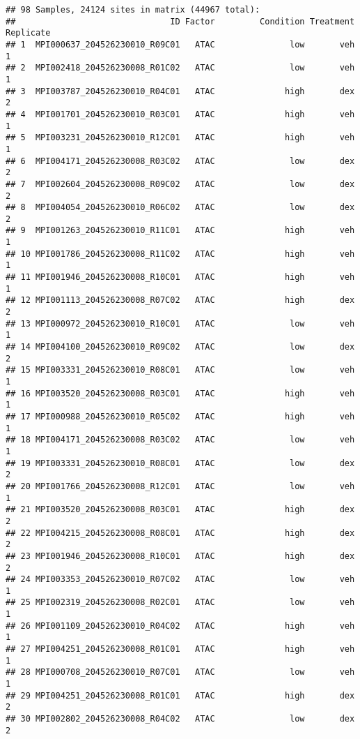 \documentclass[
]{article}
\begin{document}
\begin{verbatim}
## 98 Samples, 24124 sites in matrix (44967 total):
##                               ID Factor         Condition Treatment Replicate
## 1  MPI000637_204526230010_R09C01   ATAC               low       veh         1
## 2  MPI002418_204526230008_R01C02   ATAC               low       veh         1
## 3  MPI003787_204526230010_R04C01   ATAC              high       dex         2
## 4  MPI001701_204526230010_R03C01   ATAC              high       veh         1
## 5  MPI003231_204526230010_R12C01   ATAC              high       veh         1
## 6  MPI004171_204526230008_R03C02   ATAC               low       dex         2
## 7  MPI002604_204526230008_R09C02   ATAC               low       dex         2
## 8  MPI004054_204526230010_R06C02   ATAC               low       dex         2
## 9  MPI001263_204526230010_R11C01   ATAC              high       veh         1
## 10 MPI001786_204526230008_R11C02   ATAC              high       veh         1
## 11 MPI001946_204526230008_R10C01   ATAC              high       veh         1
## 12 MPI001113_204526230008_R07C02   ATAC              high       dex         2
## 13 MPI000972_204526230010_R10C01   ATAC               low       veh         1
## 14 MPI004100_204526230010_R09C02   ATAC               low       dex         2
## 15 MPI003331_204526230010_R08C01   ATAC               low       veh         1
## 16 MPI003520_204526230008_R03C01   ATAC              high       veh         1
## 17 MPI000988_204526230010_R05C02   ATAC              high       veh         1
## 18 MPI004171_204526230008_R03C02   ATAC               low       veh         1
## 19 MPI003331_204526230010_R08C01   ATAC               low       dex         2
## 20 MPI001766_204526230008_R12C01   ATAC               low       veh         1
## 21 MPI003520_204526230008_R03C01   ATAC              high       dex         2
## 22 MPI004215_204526230008_R08C01   ATAC              high       dex         2
## 23 MPI001946_204526230008_R10C01   ATAC              high       dex         2
## 24 MPI003353_204526230010_R07C02   ATAC               low       veh         1
## 25 MPI002319_204526230008_R02C01   ATAC               low       veh         1
## 26 MPI001109_204526230010_R04C02   ATAC              high       veh         1
## 27 MPI004251_204526230008_R01C01   ATAC              high       veh         1
## 28 MPI000708_204526230010_R07C01   ATAC               low       veh         1
## 29 MPI004251_204526230008_R01C01   ATAC              high       dex         2
## 30 MPI002802_204526230008_R04C02   ATAC               low       dex         2

\end{verbatim}
\end{document}
